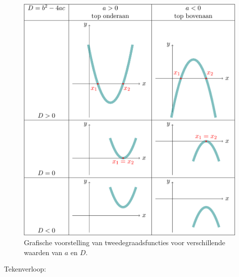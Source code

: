 

\begin{figure}[H]
\centering 
\includegraphics[scale=0.8]{2_elem_rekenvaardigheden_B/inputs/tweedegraadsfuncties2.jpg} 
\caption{Grafische voorstelling van tweedegraadsfuncties voor verschillende waarden van $a$ en $D$.}
\label{fig:tweede:gevallen}
\end{figure}



Tekenverloop:

